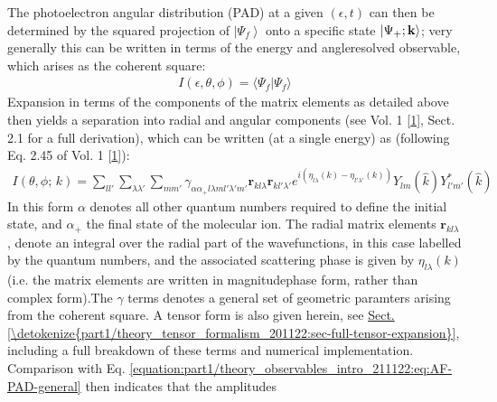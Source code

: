 \documentclass[letterpaper,table,10pt,english]{jupyterBook}
\begin{document}
\sphinxAtStartPar
The photoelectron angular distribution (PAD) at a given \((\epsilon,t)\)
can then be determined by the squared projection of
\(\left|\Psi_f\right>\) onto a specific state
\(\left|\Psi_{+};\bf{k}\right>\); very generally this can be written in terms of the energy and angle\sphinxhyphen{}resolved observable, which arises as the coherent square:
\begin{equation}\label{equation:part1/theory_photoionization_dynamics_191122:eq:matE-sq-general}
\begin{split}
I(\epsilon,\theta,\phi)=\langle\Psi_{f}|\Psi_{f}\rangle
\end{split}
\end{equation}
\sphinxAtStartPar
Expansion in terms of the components of the matrix elements as detailed above then yields a separation into radial and angular components (see  Vol. 1 {[}\hyperlink{cite.backmatter/bibliography:id613}{1}{]}, Sect. 2.1 for a full derivation), which can be written (at a single energy) as (following Eq. 2.45 of  Vol. 1 {[}\hyperlink{cite.backmatter/bibliography:id613}{1}{]}):
\begin{equation}\label{equation:part1/theory_photoionization_dynamics_191122:eq:I-reduced-LF-2_45-vol1}
\begin{split}
I(\theta,\phi;\,k)=\sum_{ll'}\sum_{\lambda\lambda'}\sum_{mm'}\gamma_{\alpha\alpha_{+}l\lambda ml'\lambda'm'}\boldsymbol{r}_{kl\lambda}\boldsymbol{r}_{kl'\lambda'}e^{i(\eta_{l\lambda}(k)-\eta_{l'\lambda'}(k))}Y_{lm}(\hat{k})Y_{l'm'}^{*}(\hat{k})
\end{split}
\end{equation}
\sphinxAtStartPar
In this form \(\alpha\) denotes all other quantum numbers required to define the initial state, and \(\alpha_{+}\) the final state of the molecular ion. The radial matrix elements \(\boldsymbol{r}_{kl\lambda}\), denote an integral over the radial part of the wavefunctions, in this case labelled by the {\hyperref[\detokenize{backmatter/glossary:term-MF}]{}} quantum numbers, and the associated scattering phase is given by \(\eta_{l\lambda}(k)\) (i.e. the matrix elements are written in magnitude\sphinxhyphen{}phase form, rather than complex form).The \(\gamma\) terms denotes a general set of geometric paramters arising from the coherent square.  A tensor form is also given herein, see \hyperref[\detokenize{part1/theory_tensor_formalism_201122:sec-full-tensor-expansion}]{Sect.\@ \ref{\detokenize{part1/theory_tensor_formalism_201122:sec-full-tensor-expansion}}}, including a full breakdown of these terms and numerical implementation. Comparison with Eq. \eqref{equation:part1/theory_observables_intro_211122:eq:AF-PAD-general} then indicates that the amplitudes
\end{document}
